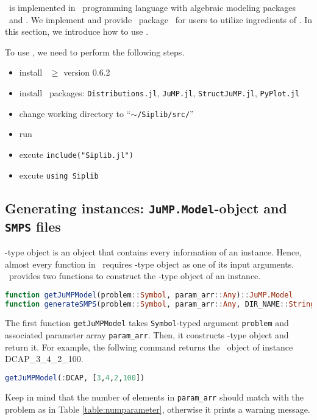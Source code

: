 \siplibtwo\ is implemented in \julia\ programming language with algebraic modeling packages \jump\ and \structjump. We implement and provide \julia\ package \siplibjl\ for users to utilize ingredients of \siplibtwo. In this section, we introduce how to use \siplibjl.

To use \siplibjl, we need to perform the following steps.
\begin{itemize}
	\item install \julia\ $\ge$ version 0.6.2
	\item install \julia\ packages: \texttt{Distributions.jl}, \texttt{JuMP.jl}, \texttt{StructJuMP.jl}, \texttt{PyPlot.jl}
	\item change working directory to ``\texttt{$\sim$/Siplib/src/}''
	\item run \julia\
	\item excute \texttt{include("Siplib.jl")}
	\item excute \texttt{using Siplib}
\end{itemize}


\subsection{Generating instances: \texttt{JuMP.Model}-object and \texttt{SMPS} files}
\jumpmodel-type object is an object that contains every information of an instance. Hence, almost every function in \siplibjl\ requires \jumpmodel-type object as one of its input arguments. \siplibjl\ provides two functions to construct the \jumpmodel-type object of an instance.
\begin{lstlisting}[frame=single,language=julia]
function getJuMPModel(problem::Symbol, param_arr::Any)::JuMP.Model
function generateSMPS(problem::Symbol, param_arr::Any, DIR_NAME::String="$(dirname(@__FILE__))/../instance")::JuMP.Model
\end{lstlisting}

The first function \texttt{getJuMPModel} takes \texttt{Symbol}-typed argument \texttt{problem} and associated parameter array \texttt{param\_arr}. Then, it constructs \jumpmodel-type object and return it. For example, the follwing command returns the \jumpmodel\ object of instance DCAP\_3\_4\_2\_100.
\begin{lstlisting}[frame=single,language=julia]
getJuMPModel(:DCAP, [3,4,2,100])
\end{lstlisting}
Keep in mind that the number of elements in \texttt{param\_arr} should match with the problem as in Table \ref{table:numparameter}, otherwise it prints a warning message.

